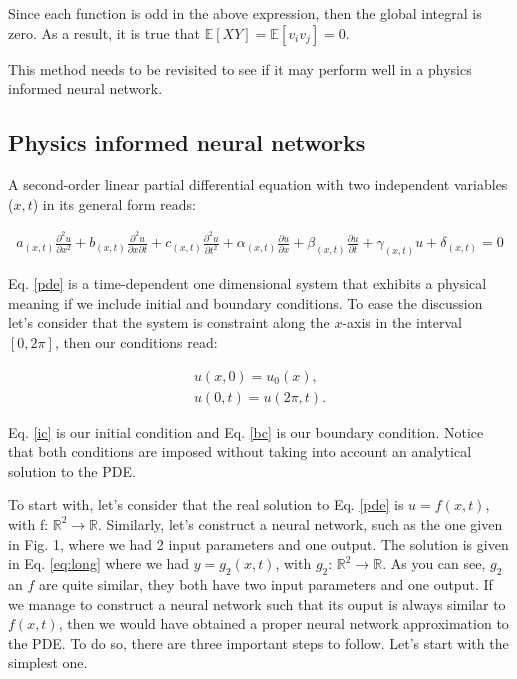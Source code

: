 \documentclass{article}
\begin{document}
Since each function is odd in the above expression, then the global integral is zero. As a result, it is true that $\mathbb{E}[XY] = \mathbb{E}[v_iv_j]=0$.

This method needs to be revisited to see if it may perform well in a physics informed neural network.

\subsection{Physics informed neural networks}

A second-order linear partial differential equation with two independent variables ($x,t$) in its general form reads:


\begin{align}
\label{pde}
a_{(x,t)}\frac{\partial^2 u}{\partial x^2}+ 
b_{(x,t)}\frac{\partial^2 u}{\partial x \partial t}+ 
c_{(x,t)}\frac{\partial^2 u}{\partial t^2}+ 
\alpha_{(x,t)}\frac{\partial u}{\partial x}+ 
\beta_{(x,t)}\frac{\partial u}{\partial t}+ 
\gamma_{(x,t)}u+ 
\delta_{(x,t)} 
=0
\end{align}

Eq. \eqref{pde} is a time-dependent one dimensional system that exhibits a physical meaning if we include initial and boundary conditions. To ease the discussion let's consider that the system is constraint along the $x$-axis in the interval $[0,2\pi]$, then our conditions read:

\begin{align}
\label{ic}
u(x,0) = u_0(x), \\
u(0,t) = u(2\pi,t).
\label{bc}
\end{align}

Eq. \eqref{ic} is our initial condition and Eq. \eqref{bc} is our boundary condition. Notice that both conditions are imposed without taking into account an analytical solution to the PDE. 

To start with, let's consider that the real solution to Eq. \eqref{pde} is $u=f(x,t)$, with f: $\mathbb{R}^2 \rightarrow \mathbb{R}$. 
Similarly, let's construct a neural network, such as the one given in Fig. 1, where we had 2 input parameters and one output. The solution is given in Eq. \eqref{eq:long} where we had $y=g_2(x,t)$, with $g_2$: $\mathbb{R}^2 \rightarrow \mathbb{R}$. As you can see, $g_2$ an $f$ are quite similar, they both have two input parameters and one output. If we manage to construct a neural network such that its ouput is always similar to $f(x,t)$, then we would have obtained a proper neural network approximation to the PDE.
To do so, there are three important steps to follow. Let's start with the simplest one.
\end{document}
